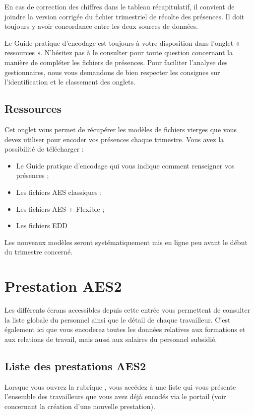\begin{remarque}
En cas de correction des chiffres dans le tableau récapitulatif, il convient de joindre la version corrigée du fichier trimestriel de récolte des présences. Il doit toujours y avoir concordance entre les deux sources de données.
\end{remarque}

Le Guide pratique d’encodage est toujours à votre disposition dans l’onglet « ressources ». N’hésitez pas à le consulter pour toute question concernant la manière de compléter les fichiers de présences. Pour faciliter l’analyse des gestionnaires, nous vous demandons de bien respecter les consignes sur l’identification et le classement des onglets. 

\subsection{Ressources}
Cet onglet vous permet de récupérer les modèles de fichiers vierges que vous devez utiliser pour encoder vos présences chaque trimestre.
Vous avez la possibilité de télécharger : 
\begin{itemize}
    \item Le Guide pratique d’encodage qui vous indique comment renseigner vos présences ;
    \item Les fichiers AES classiques ;
    \item Les fichiers AES + Flexible ;
    \item Les fichiers EDD
\end{itemize}
Les nouveaux modèles seront systématiquement mis en ligne peu avant le début du trimestre concerné. 

\section{Prestation AES2}\label{aes2_prestation}
Les différents écrans accessibles depuis cette entrée vous permettent de consulter la liste globale du personnel ainsi que le détail de chaque travailleur. C’est également ici que vous encoderez toutes les données relatives aux formations et aux relations de travail, mais aussi aux salaires du personnel subsidié. 

\subsection{Liste des prestations AES2 }
Lorsque vous ouvrez la rubrique , vous accédez à une liste qui vous présente l’ensemble des travailleurs que vous avez déjà encodés via le portail (voir concernant la création d’une nouvelle prestation).

